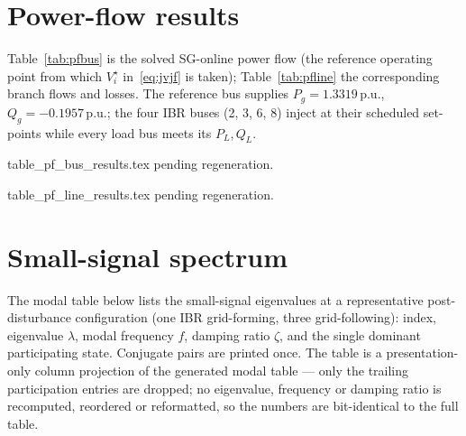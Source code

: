 \documentclass[12pt,a4paper]{article}
\newcommand{\pu}{\,\mathrm{p.u.}}
\begin{document}
\section{Power-flow results}\label{sec:pf}
Table~\ref{tab:pfbus} is the solved SG-online power flow (the reference operating
point from which $V_i^{\star}$ in~\eqref{eq:jvjf} is taken); Table~\ref{tab:pfline}
the corresponding branch flows and losses. The reference bus supplies
$P_g=1.3319\pu$, $Q_g=-0.1957\pu$; the four IBR buses (2, 3, 6, 8) inject at
their scheduled set-points while every load bus meets its $P_L,Q_L$.

\begin{table}[H]
\centering\footnotesize
\caption{Solved bus power flow at the SG-online operating point (per unit on the
system base; angles in degrees).}
\label{tab:pfbus}
 {}
 {\centering\ttfamily table\_pf\_bus\_results.tex pending regeneration.}
\end{table}

\begin{table}[H]
\centering\footnotesize
\caption{Branch power flows and losses at the SG-online operating point.}
\label{tab:pfline}
 {}
 {\centering\ttfamily table\_pf\_line\_results.tex pending regeneration.}
\end{table}

\section{Small-signal spectrum}\label{sec:sssa}
The modal table below lists the small-signal eigenvalues at a representative
post-disturbance configuration (one IBR grid-forming, three grid-following):
index, eigenvalue $\lambda$, modal frequency $f$, damping ratio $\zeta$, and the
single dominant participating state. Conjugate pairs are printed once. The table
is a presentation-only column projection of the generated modal table --- only
the trailing participation entries are dropped; no eigenvalue, frequency or
damping ratio is recomputed, reordered or reformatted, so the numbers are
bit-identical to the full table.
\end{document}
